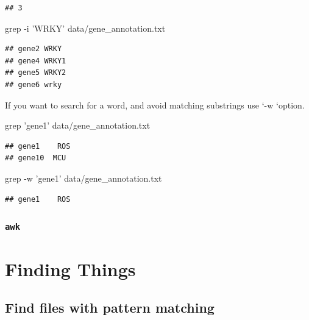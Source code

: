 \documentclass[]{book}
\makeatletter
\newenvironment{Shaded}{\begin{snugshade}}{\end{snugshade}}
\newcommand{\FunctionTok}[1]{\textcolor[rgb]{0.00,0.00,0.00}{#1}}
\newcommand{\NormalTok}[1]{#1}
\newcommand{\StringTok}[1]{\textcolor[rgb]{0.31,0.60,0.02}{#1}}
\newenvironment{kframe}{%
\medskip{}
\setlength{\fboxsep}{.8em}
 \def\at@end@of@kframe{}%
 \ifinner\ifhmode%
  \def\at@end@of@kframe{\end{minipage}}%
  \begin{minipage}{\columnwidth}%
 \fi\fi%
 \def\FrameCommand##1{\hskip\@totalleftmargin \hskip-\fboxsep
 \colorbox{shadecolor}{##1}\hskip-\fboxsep
     \hskip-\linewidth \hskip-\@totalleftmargin \hskip\columnwidth}%
 \MakeFramed {\advance\hsize-\width
   \@totalleftmargin\z@ \linewidth\hsize
   \@setminipage}}%
 {\par\unskip\endMakeFramed%
 \at@end@of@kframe}
\renewenvironment{Shaded}{\begin{kframe}}{\end{kframe}}
\makeatother
\begin{document}
\begin{verbatim}
## 3
\end{verbatim}

\begin{Shaded}
\begin{Highlighting}[]
\FunctionTok{grep}\NormalTok{ -i }\StringTok{'WRKY'}\NormalTok{ data/gene_annotation.txt }
\end{Highlighting}
\end{Shaded}

\begin{verbatim}
## gene2 WRKY
## gene4 WRKY1
## gene5 WRKY2
## gene6 wrky
\end{verbatim}

If you want to search for a word, and avoid matching substrings use `-w `option.

\begin{Shaded}
\begin{Highlighting}[]
\FunctionTok{grep} \StringTok{'gene1'}\NormalTok{ data/gene_annotation.txt }
\end{Highlighting}
\end{Shaded}

\begin{verbatim}
## gene1    ROS
## gene10  MCU
\end{verbatim}

\begin{Shaded}
\begin{Highlighting}[]
\FunctionTok{grep}\NormalTok{ -w }\StringTok{'gene1'}\NormalTok{ data/gene_annotation.txt }
\end{Highlighting}
\end{Shaded}

\begin{verbatim}
## gene1    ROS
\end{verbatim}

\hypertarget{awk}{%
\subsubsection{\texorpdfstring{\texttt{awk}}{awk}}\label{awk}}

\hypertarget{finding-things}{%
\section{Finding Things}\label{finding-things}}

\hypertarget{find-files-with-pattern-matching}{%
\subsection{Find files with pattern matching}\label{find-files-with-pattern-matching}}
\end{document}
